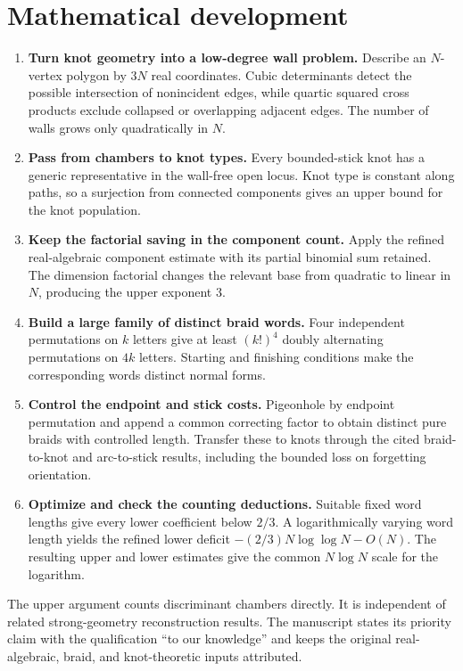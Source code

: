\documentclass[11pt]{article}
\begin{document}
\section*{Mathematical development}
\begin{enumerate}
\item \textbf{Turn knot geometry into a low-degree wall problem.}
  Describe an $N$-vertex polygon by $3N$ real coordinates. Cubic determinants
  detect the possible intersection of nonincident edges, while quartic
  squared cross products exclude collapsed or overlapping adjacent edges.
  The number of walls grows only quadratically in $N$.
\item \textbf{Pass from chambers to knot types.}
  Every bounded-stick knot has a generic representative in the wall-free
  open locus. Knot type is constant along paths, so a surjection from
  connected components gives an upper bound for the knot population.
\item \textbf{Keep the factorial saving in the component count.}
  Apply the refined real-algebraic component estimate with its partial
  binomial sum retained. The dimension factorial changes the relevant
  base from quadratic to linear in $N$, producing the upper exponent 3.
\item \textbf{Build a large family of distinct braid words.}
  Four independent permutations on $k$ letters give at least $(k!)^4$
  doubly alternating permutations on $4k$ letters. Starting and finishing
  conditions make the corresponding words distinct normal forms.
\item \textbf{Control the endpoint and stick costs.}
  Pigeonhole by endpoint permutation and append a common correcting factor
  to obtain distinct pure braids with controlled length. Transfer these to
  knots through the cited braid-to-knot and arc-to-stick results, including
  the bounded loss on forgetting orientation.
\item \textbf{Optimize and check the counting deductions.}
  Suitable fixed word lengths give every lower coefficient below $2/3$.
  A logarithmically varying word length yields the refined lower deficit
  $-(2/3)N\log\log N-O(N)$. The resulting upper and lower estimates give
  the common $N\log N$ scale for the logarithm.
\end{enumerate}

The upper argument counts discriminant chambers directly. It is independent
of related strong-geometry reconstruction results. The manuscript states
its priority claim with the qualification ``to our knowledge'' and keeps
the original real-algebraic, braid, and knot-theoretic inputs attributed.
\end{document}
